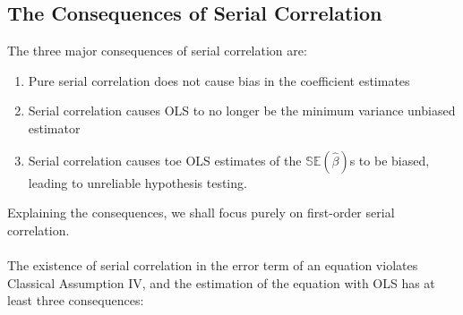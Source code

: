 \documentclass[11pt]{article}
\begin{document}
\subsection{The Consequences of Serial Correlation}
The three major consequences of serial correlation are:
\begin{enumerate}
\item Pure serial correlation does not cause bias in the coefficient estimates
\item Serial correlation causes OLS to no longer be the minimum variance unbiased estimator
\item Serial correlation causes toe OLS estimates of the $\mathbb{SE}(\hat{\beta})$s to be biased, leading to unreliable hypothesis testing.
\end{enumerate}
Explaining the consequences, we shall focus purely on first-order serial correlation.\\ \\
The existence of serial correlation in the error term of an equation violates Classical Assumption IV, and the estimation of the equation with OLS has at least three consequences:
\end{document}
